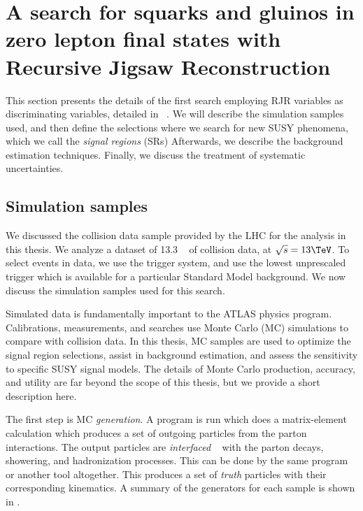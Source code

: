 

\chapter[A search for squarks and gluinos in zero lepton final states with Recursive Jigsaw Reconstruction][Top of Page Title]{A search for squarks and gluinos in zero lepton final states with Recursive Jigsaw Reconstruction}

This section presents the details of the first search employing RJR variables as discriminating variables, detailed in ~\cite{ATLAS-CONF-2016-078}.
We will describe the simulation samples used, and then define the selections where we search for new SUSY phenomena, which we call the \textit{signal regions} (SRs)
Afterwards, we describe the background estimation techniques.
Finally, we discuss the treatment of systematic uncertainties.

\section{Simulation samples}

We discussed the collision data sample provided by the LHC for the analysis in this thesis.
We analyze a dataset of 13.3 \ifb~ of collision data, at $\sqrt{s} = 13 \TeV$.
To select events in data, we use the trigger system, and use the lowest unprescaled trigger which is available for a particular Standard Model background.
We now discuss the simulation samples used for this search.

Simulated data is fundamentally important to the ATLAS physics program.
Calibrations, measurements, and searches use Monte Carlo (MC) simulations to compare with collision data.
In this thesis, MC samples are used to optimize the signal region selections, assist in background estimation, and assess the sensitivity to specific SUSY signal models.
The details of Monte Carlo production, accuracy, and utility are far beyond the scope of this thesis, but we provide a short description here.

The first step is MC \textit{generation}.
A program is run which does a matrix-element calculation which produces a set of outgoing particles from the parton interactions.
The output particles are \textit{interfaced} ~\cite{Mangano:2006rw} with the parton decays, showering, and hadronization processes.
This can be done by the same program or another tool altogether.
This produces a set of \textit{truth} particles with their corresponding kinematics.
A summary of the generators for each sample is shown in .

